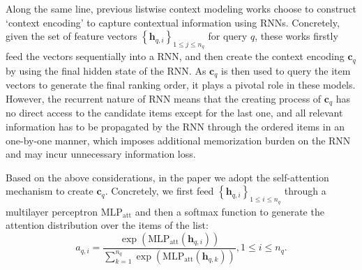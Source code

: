 \documentclass[letterpaper]{article}
\begin{document}
Along the same line, previous listwise context modeling works \cite{ai2018learning,DCM} choose to construct `context encoding' to capture contextual information using RNNs. Concretely, given the set of feature vectors ${{\left\{ {{\mathbf{h}}_{q,i}} \right\}}_{1\le j\le {{n}_{q}}}}$ for query $q$, these works firstly feed the vectors sequentially into a RNN, and then create the context encoding  ${{\mathbf{c}}_{q}}$ by using the final hidden state of the RNN. As ${{\mathbf{c}}_{q}}$ is then used to query the item vectors to generate the final ranking order, it plays a pivotal role in these models. However, the recurrent nature of RNN means that the creating process of ${{\mathbf{c}}_{q}}$ has no direct access to the candidate items except for the last one, and all relevant information has to be propagated by the RNN through the ordered items in an one-by-one manner, which imposes additional memorization burden on the RNN and may incur unnecessary information loss.


Based on the above considerations, in the paper we adopt the self-attention mechanism \cite{lin2017structured,vaswani2017attention} to create ${{\mathbf{c}}_{q}}$. Concretely, we first feed ${{\left\{ {{\mathbf{h}}_{q,i}} \right\}}_{1\le i\le {{n}_{q}}}}$ through a multilayer perceptron $\text{ML}{{\text{P}}_{\text{att}}}$ and then a softmax function to generate the attention distribution over the items of the list:
\begin{equation}
\label{attweight}
{{a}_{q,i}}=\frac{\exp \left( \text{ML}{{\text{P}}_{\text{att}}}\left( {{\mathbf{h}}_{q,i}} \right) \right)}{\sum\limits_{k=1}^{{{n}_{q}}}{\exp \left( \text{ML}{{\text{P}}_{\text{att}}}\left( {{\mathbf{h}}_{q,k}} \right) \right)}},1\le i\le n_{q}.
\end{equation}
\end{document}
